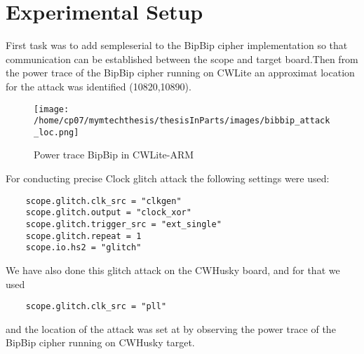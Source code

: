 \section{Experimental Setup}
First task was to add sempleserial to the BipBip cipher implementation so that communication can be established between the scope and target board.Then from the power trace of the BipBip cipher running on CWLite an approximat location for the attack was identified (10820,10890).
\begin{figure}[h]
    \centering
    \texttt{[image: /home/cp07/mymtechthesis/thesisInParts/images/bibbip\_attack\_loc.png]}
    \caption{Power trace BipBip in CWLite-ARM}
    \label{fig:bipbip_powertrace}
\end{figure}
For conducting precise Clock glitch attack the following settings were used:
\begin{verbatim}
    scope.glitch.clk_src = "clkgen"
    scope.glitch.output = "clock_xor"
    scope.glitch.trigger_src = "ext_single"
    scope.glitch.repeat = 1
    scope.io.hs2 = "glitch"
\end{verbatim}
We have also done this glitch attack on the CWHusky board, and for that we used 
\begin{verbatim}
    scope.glitch.clk_src = "pll"
\end{verbatim}
and the location of the attack was set at by observing the power trace of the BipBip cipher running on CWHusky target.


